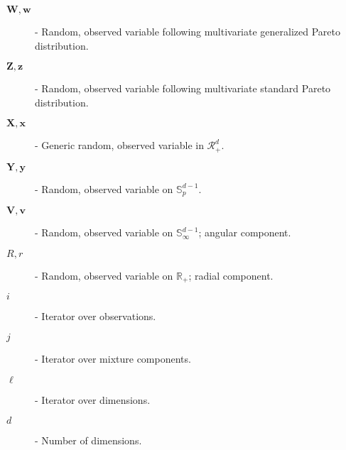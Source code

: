 \documentclass{article}
\begin{document}
\begin{description}
\item[$\bm{W},\bm{w}$] - Random, observed variable following multivariate generalized Pareto distribution.
\item[$\bm{Z},\bm{z}$] - Random, observed variable following multivariate standard Pareto distribution.
\item[$\bm{X},\bm{x}$] - Generic random, observed variable in $\mathcal{R}_+^d$.
\item[$\bm{Y},\bm{y}$] - Random, observed variable on $\mathbb{S}_p^{d-1}$.
\item[$\bm{V},\bm{v}$] - Random, observed variable on $\mathbb{S}_{\infty}^{d-1}$; angular component.
\item[$R,r$] - Random, observed variable on $\mathbb{R}_+$; radial component.
\item[$i$] - Iterator over observations.
\item[$j$] - Iterator over mixture components.
\item[$\ell$] - Iterator over dimensions.
\item[$d$] - Number of dimensions.

    
\end{description}
    
\end{document}

